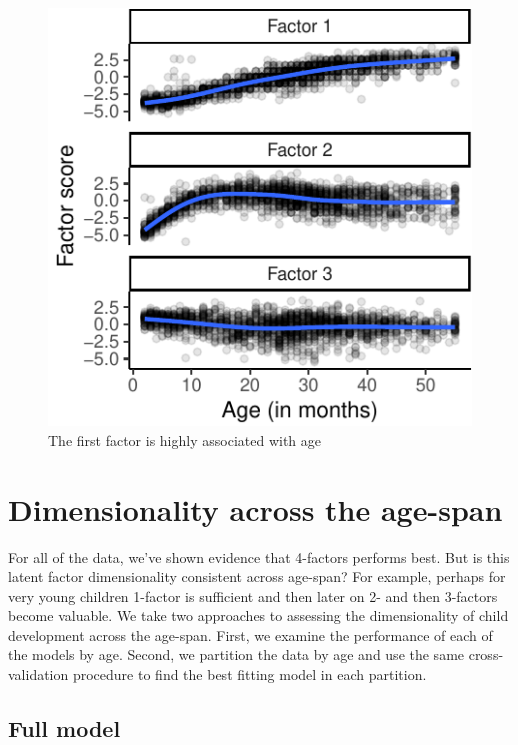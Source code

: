 \documentclass[10pt, letterpaper]{article}
\newenvironment{CodeChunk}{}{}
\begin{document}
\begin{CodeChunk}
\begin{figure}[tb]
\includegraphics{figs/factorscores-1} \caption[The first factor is highly associated with age]{The first factor is highly associated with age}\label{fig:factorscores}
\end{figure}
\end{CodeChunk}

\hypertarget{dimensionality-across-the-age-span}{%
\section{Dimensionality across the
age-span}\label{dimensionality-across-the-age-span}}

For all of the data, we've shown evidence that 4-factors performs best.
But is this latent factor dimensionality consistent across age-span? For
example, perhaps for very young children 1-factor is sufficient and then
later on 2- and then 3-factors become valuable. We take two approaches
to assessing the dimensionality of child development across the
age-span. First, we examine the performance of each of the models by
age. Second, we partition the data by age and use the same
cross-validation procedure to find the best fitting model in each
partition.

\hypertarget{full}{%
\subsection{Full model}\label{full}}
\end{document}
